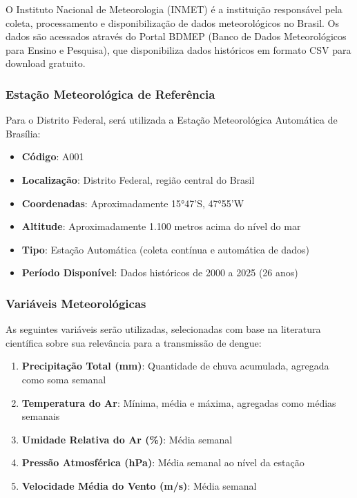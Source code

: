 O Instituto Nacional de Meteorologia (INMET) é a instituição responsável pela coleta, processamento e disponibilização de dados meteorológicos no Brasil. Os dados são acessados através do Portal BDMEP (Banco de Dados Meteorológicos para Ensino e Pesquisa), que disponibiliza dados históricos em formato CSV para download gratuito.

\subsubsection{Estação Meteorológica de Referência}

Para o Distrito Federal, será utilizada a Estação Meteorológica Automática de Brasília:
\begin{itemize}
    \item \textbf{Código}: A001
    \item \textbf{Localização}: Distrito Federal, região central do Brasil
    \item \textbf{Coordenadas}: Aproximadamente 15°47'S, 47°55'W
    \item \textbf{Altitude}: Aproximadamente 1.100 metros acima do nível do mar
    \item \textbf{Tipo}: Estação Automática (coleta contínua e automática de dados)
    \item \textbf{Período Disponível}: Dados históricos de 2000 a 2025 (26 anos)
\end{itemize}

\subsubsection{Variáveis Meteorológicas}

As seguintes variáveis serão utilizadas, selecionadas com base na literatura científica sobre sua relevância para a transmissão de dengue:

\begin{enumerate}
    \item \textbf{Precipitação Total (mm)}: Quantidade de chuva acumulada, agregada como soma semanal
    \item \textbf{Temperatura do Ar}: Mínima, média e máxima, agregadas como médias semanais
    \item \textbf{Umidade Relativa do Ar (\%)}: Média semanal
    \item \textbf{Pressão Atmosférica (hPa)}: Média semanal ao nível da estação
    \item \textbf{Velocidade Média do Vento (m/s)}: Média semanal
\end{enumerate}

